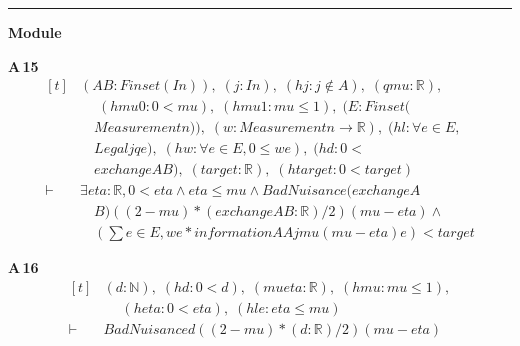 \vspace{4pt}\noindent\rule{\columnwidth}{0.4pt}\par\vspace{2pt}
\noindent\textbf{Module }\par\vspace{3pt}

\noindent\textbf{A\,15}\quad{}
{\footnotesize\[ \begin{aligned}[t]
&(\mathit{A} \mathit{B} : \mathit{Finset} (\mathit{I} \mathit{n})),\; (\mathit{j} : \mathit{I} \mathit{n}),\; (\mathit{hj} : \mathit{j} \notin \mathit{A}),\; (\mathit{q} \mathit{mu} : \mathbb{R} ),\\
&\quad \; (\mathit{hmu0} : 0 < \mathit{mu}),\; (\mathit{hmu1} : \mathit{mu} \leq 1),\; (\mathit{E} : \mathit{Finset} (\\
&\quad \mathit{Measurement} \mathit{n})),\; (\mathit{w} : \mathit{Measurement} \mathit{n} \to \mathbb{R} ),\; (\mathit{hl} : \forall \mathit{e} \in \mathit{E},\\
&\quad \mathit{Legal} \mathit{j} \mathit{q} \mathit{e}),\; (\mathit{hw} : \forall \mathit{e} \in \mathit{E}, 0 \leq \mathit{w} \mathit{e}),\; (\mathit{hd} : 0 <\\
&\quad \mathit{exchange} \mathit{A} \mathit{B}),\; (\mathit{target} : \mathbb{R} ),\; (\mathit{htarget} : 0 < \mathit{target})\\
\vdash\;&\exists \mathit{eta} : \mathbb{R} , 0 < \mathit{eta} \wedge \mathit{eta} \leq \mathit{mu} \wedge \mathit{BadNuisance} (\mathit{exchange} \mathit{A}\\
&\quad \mathit{B}) ((2-\mathit{mu})*(\mathit{exchange} \mathit{A} \mathit{B}:\mathbb{R} )/2) (\mathit{mu}-\mathit{eta}) \wedge\\
&\quad (\textstyle\sum \mathit{e} \in \mathit{E},\mathit{w} \mathit{e}*\mathit{information} \mathit{A} \mathit{A} \mathit{j} \mathit{mu} (\mathit{mu}-\mathit{eta}) \mathit{e}) < \mathit{target}
\end{aligned} \]}

\noindent\textbf{A\,16}\quad{}
{\footnotesize\[ \begin{aligned}[t]
&(\mathit{d} : \mathbb{N} ),\; (\mathit{hd} : 0 < \mathit{d}),\; (\mathit{mu} \mathit{eta} : \mathbb{R} ),\; (\mathit{hmu} : \mathit{mu} \leq 1),\\
&\quad \; (\mathit{heta} : 0 < \mathit{eta}),\; (\mathit{hle} : \mathit{eta} \leq \mathit{mu})\\
\vdash\;&\mathit{BadNuisance} \mathit{d} ((2-\mathit{mu})*(\mathit{d}:\mathbb{R} )/2) (\mathit{mu}-\mathit{eta})
\end{aligned} \]}

